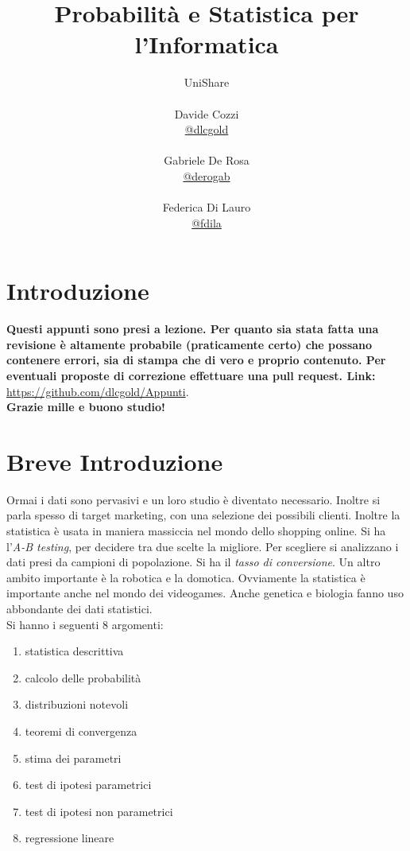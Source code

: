\documentclass[a4paper,12pt, oneside]{book}
\title{Probabilità e Statistica per l'Informatica}
\author{UniShare\\\\Davide Cozzi\\\href{https://t.me/dlcgold}{@dlcgold}\\\\Gabriele De Rosa\\\href{https://t.me/derogab}{@derogab} \\\\Federica Di Lauro\\\href{https://t.me/f_dila}{@f\textunderscore dila}}
\date{}
\begin{document}
\maketitle


\newtheorem{teorema}{Teorema}
\newtheorem{definizione}{Definizione}
\newtheorem{esempio}{Esempio}
\newtheorem{corollario}{Corollario}
\newtheorem{lemma}{Lemma}
\newtheorem{osservazione}{Osservazione}
\newtheorem{nota}{Nota}
\newtheorem{esercizio}{Esercizio}
\tableofcontents
\renewcommand{\chaptermark}[1]{%
\markboth{\chaptername
\ \thechapter.\ #1}{}}
\renewcommand{\sectionmark}[1]{\markright{\thesection.\ #1}}
\chapter{Introduzione}
\textbf{Questi appunti sono presi a lezione. Per quanto sia stata fatta una revisione è altamente probabile (praticamente certo) che possano contenere errori, sia di stampa che di vero e proprio contenuto. Per eventuali proposte di correzione effettuare una pull request. Link: } \url{https://github.com/dlcgold/Appunti}.\\
\textbf{Grazie mille e buono studio!}
\chapter{Breve Introduzione}
Ormai i dati sono pervasivi e un loro studio è diventato necessario. Inoltre si parla spesso di target marketing, con una selezione dei possibili clienti. Inoltre la statistica è usata in maniera massiccia nel mondo dello shopping online. Si ha l'\textit{A-B testing}, per decidere tra due scelte la migliore. Per scegliere si analizzano i dati presi da campioni di popolazione. Si ha il \textit{tasso di conversione}. Un altro ambito importante è la robotica e la domotica. Ovviamente la statistica è importante anche nel mondo dei videogames. Anche genetica e biologia fanno uso abbondante dei dati statistici. \\
Si hanno i seguenti 8 argomenti:
\begin{enumerate}
\item statistica descrittiva
\item calcolo delle probabilità
\item distribuzioni notevoli
\item teoremi di convergenza
\item stima dei parametri
\item test di ipotesi parametrici
\item test di ipotesi non parametrici
\item regressione lineare
\end{enumerate}
\end{document}
